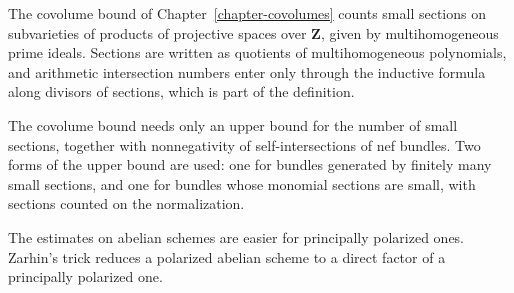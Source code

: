 The covolume bound of Chapter~\ref{chapter-covolumes} counts small sections on
subvarieties of products of projective spaces over $\mathbf Z$, given by
multihomogeneous prime ideals. Sections are written as quotients of
multihomogeneous polynomials, and arithmetic intersection numbers enter only
through the inductive formula along divisors of sections, which is part of
the definition.

The covolume bound needs only an upper bound for the number of small
sections, together with nonnegativity of self-intersections of nef bundles.
Two forms of the upper bound are used: one for bundles generated by finitely
many small sections, and one for bundles whose monomial sections are small,
with sections counted on the normalization.

The estimates on abelian schemes are easier for principally polarized ones.
Zarhin's trick reduces a polarized abelian scheme to a direct factor of a
principally polarized one.
